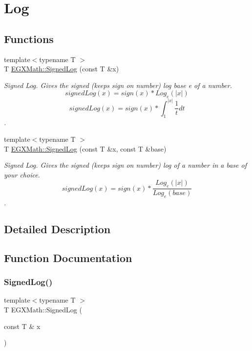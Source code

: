 \hypertarget{group___e_g_x_math-_functions-_log}{}\section{Log}
\label{group___e_g_x_math-_functions-_log}
\subsection*{Functions}
\begin{DoxyCompactItemize}
\item 
{\footnotesize template$<$typename T $>$ }\\T \mbox{\hyperlink{group___e_g_x_math-_functions-_log_gac87b6832572195929967808d98d502d5}{E\+G\+X\+Math\+::\+Signed\+Log}} (const T \&x)
\begin{DoxyCompactList}\small\item\em Signed Log. Gives the signed (keeps sign on number) log base e of a number. \[signedLog(x)= sign(x)*Log_e(|x|)\] \[signedLog(x)= sign(x)*\int_{1}^{|x|}\frac{1}{t} dt\]. \end{DoxyCompactList}\item 
{\footnotesize template$<$typename T $>$ }\\T \mbox{\hyperlink{group___e_g_x_math-_functions-_log_ga4cd6a087fb1977d52a321bfad0dae0f6}{E\+G\+X\+Math\+::\+Signed\+Log}} (const T \&x, const T \&base)
\begin{DoxyCompactList}\small\item\em Signed Log. Gives the signed (keeps sign on number) log of a number in a base of your choice. \[signedLog(x)= sign(x)*\frac{Log_e(|x|)}{Log_e(base)}\]. \end{DoxyCompactList}\end{DoxyCompactItemize}


\subsection{Detailed Description}


\subsection{Function Documentation}
\mbox{\label{group___e_g_x_math-_functions-_log_gac87b6832572195929967808d98d502d5}} 
\subsubsection{\texorpdfstring{Signed\+Log()}{SignedLog()}\hspace{0.1cm}{\footnotesize\ttfamily [1/2]}}
{\footnotesize\ttfamily template$<$typename T $>$ \\
T E\+G\+X\+Math\+::\+Signed\+Log (\begin{DoxyParamCaption}\item[{const T \&}]{x }\end{DoxyParamCaption})}



